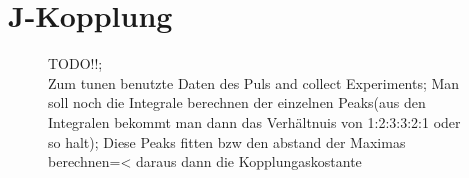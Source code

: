 \section{J-Kopplung}
\begin{figure}[H]
    \centering
    
    \caption{TODO!!;\\
    Zum tunen benutzte Daten des Puls and collect Experiments; Man soll noch die Integrale berechnen der einzelnen Peaks(aus den Integralen bekommt man dann das Verhältnuis von 1:2:3:3:2:1 oder so halt); Diese Peaks fitten bzw den abstand der Maximas berechnen=< daraus dann die Kopplungaskostante}
\end{figure}

